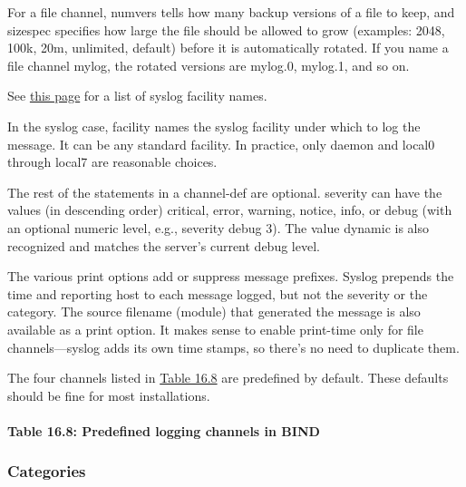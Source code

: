 
For a file channel, {numvers} tells how many backup versions of a file
to keep, and {sizespec} specifies how large the file should be allowed
to grow (examples: {2048}, {100k}, {20m}, {unlimited}, {default}) before
it is automatically rotated. If you name a file channel {mylog}, the
rotated versions are {mylog.0}, {mylog.1}, and so on.

\leavevmode\hypertarget{part0024_split_070.htmlux5cux23_idContainer1057}{}%
See
\protect\hyperlink{part0017_split_012.htmlux5cux23_idTextAnchor513}{this
page} for a list of syslog facility names.

In the syslog case, {facility} names the syslog facility under which to
log the message. It can be any standard facility. In practice, only
daemon and local0 through local7 are reasonable choices.

The rest of the statements in a {channel-def} are optional. {severity}
can have the values (in descending order) {critical}, {error},
{warning}, {notice}, {info}, or {debug} (with an optional numeric level,
e.g., {severity debug 3}). The value {dynamic} is also recognized and
matches the server's current debug level.

The various {print} options add or suppress message prefixes. Syslog
prepends the time and reporting host to each message logged, but not the
severity or the category. The source filename (module) that generated
the message is also available as a {print} option. It makes sense to
enable {print-time} only for file channels---syslog adds its own time
stamps, so there's no need to duplicate them.

The four channels listed in
\protect\hyperlink{part0024_split_070.htmlux5cux23_idTextAnchor958}{Table
16.8} are predefined by default. These defaults should be fine for most
installations.

\paragraph[{Table 16.8: }Predefined logging channels in
BIND]{\texorpdfstring{{Table 16.8:
}\protect\hypertarget{part0024_split_070.htmlux5cux23_idTextAnchor958}{}{}Predefined
logging channels in
BIND}{Table 16.8: Predefined logging channels in BIND}}


\subsubsection[Categories]{\texorpdfstring{\protect\hypertarget{part0024_split_070.htmlux5cux23_idTextAnchor959}{}{}Categories}{Categories}}

